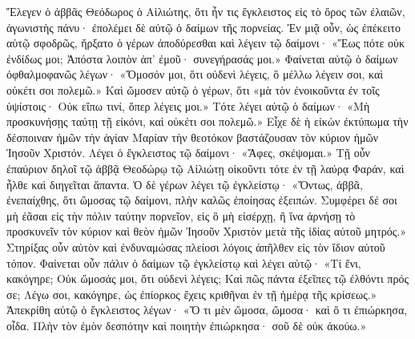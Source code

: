 \documentclass[10pt]{book}
\newcommand{\switchEnglish}{\selectlanguage{english} \switchcolumn}
\begin{document}
\begin{paracol}{2}
Ἔλεγεν ὁ ἀββᾶς Θεόδωρος ὁ Αἰλιώτης, ὅτι ἦν τις ἔγκλειστος εἰς τὸ ὄρος τῶν
ἐλαιῶν, ἀγωνιστὴς πάνυ· ἐπολέμει δὲ αὐτῷ ὁ δαίμων τῆς πορνείας. Ἐν μιᾷ οὖν, ὡς
ἐπέκειτο αὐτῷ σφοδρῶς, ἤρξατο ὁ γέρων ἀποδύρεσθαι καὶ λέγειν τῷ δαίμονι· «Ἕως
πότε οὐκ ἐνδίδως μοι; Ἀπόστα λοιπὸν ἀπ’ ἐμοῦ· συνεγήρασάς μοι.» Φαίνεται αὐτῷ
ὁ δαίμων ὀφθαλμοφανῶς λέγων· «Ὄμοσόν μοι, ὅτι οὐδενὶ λέγεις, ὃ μέλλω λέγειν
σοι, καὶ οὐκέτι σοι πολεμῶ.» Καὶ ὤμοσεν αὐτῷ ὁ γέρων, ὅτι «μὰ τὸν ἐνοικοῦντα
ἐν τοῖς ὑψίστοις· Οὐκ εἴπω τινί, ὅπερ λέγεις μοι.» Τότε λέγει αὐτῷ ὁ δαίμων·
«Μὴ προσκυνήσῃς ταύτῃ τῇ εἰκόνι, καὶ οὐκέτι σοι πολεμῶ.» Εἶχε δὲ ἡ εἰκὼν
ἐκτύπωμα τὴν δέσποιναν ἡμῶν τὴν ἁγίαν Μαρίαν τὴν θεοτόκον βαστάζουσαν τὸν
κύριον ἡμῶν Ἰησοῦν Χριστόν. Λέγει ὁ ἔγκλειστος τῷ δαίμονι· «Ἄφες, σκέψομαι.»
Τῇ οὖν ἐπαύριον δηλοῖ τῷ ἀββᾷ Θεοδώρῳ τῷ Αἰλιώτῃ οἰκοῦντι τότε ἐν τῇ λαύρᾳ
Φαράν, καὶ ἦλθε καὶ διηγεῖται ἅπαντα. Ὁ δὲ γέρων λέγει τῷ ἐγκλείστῳ· «Ὄντως,
ἀββᾶ, ἐνεπαίχθης, ὅτι ὤμοσας τῷ δαίμονι, πλὴν καλῶς ἐποίησας ἐξειπών. Συμφέρει
δέ σοι μὴ ἐᾶσαι εἰς τὴν πόλιν ταύτην πορνεῖον, εἰς ὃ μὴ εἰσέρχῃ, ἢ ἵνα ἀρνήσῃ
τὸ προσκυνεῖν τὸν κύριον καὶ θεὸν ἡμῶν Ἰησοῦν Χριστὸν μετὰ τῆς ἰδίας αὐτοῦ
μητρός.» Στηρίξας οὖν αὐτὸν καὶ ἐνδυναμώσας πλείοσι λόγοις ἀπῆλθεν εἰς τὸν
ἴδιον αὐτοῦ τόπον. Φαίνεται οὖν πάλιν ὁ δαίμων τῷ ἐγκλείστῳ καὶ λέγει αὐτῷ·
«Τί ἔνι, κακόγηρε; Οὐκ ὤμοσάς μοι, ὅτι οὐδενὶ λέγεις; Καὶ πῶς πάντα ἐξεῖπες τῷ
ἐλθόντι πρός σε; Λέγω σοι, κακόγηρε, ὡς ἐπίορκος ἔχεις κριθῆναι ἐν τῇ ἡμέρᾳ
τῆς κρίσεως.» Ἀπεκρίθη αὐτῷ ὁ ἔγκλειστος λέγων· «Ὅ τι μὲν ὤμοσα, ὤμοσα· καὶ ὅ
τι ἐπιώρκησα, οἶδα. Πλὴν τὸν ἐμὸν δεσπότην καὶ ποιητὴν ἐπιώρκησα· σοῦ δὲ οὐκ
ἀκούω.»

\switchEnglish


\end{paracol}
\end{document}
